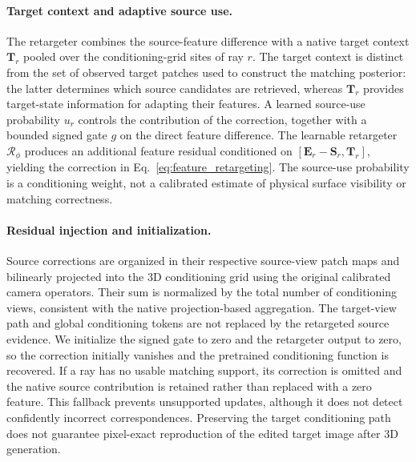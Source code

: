 \begin{appendix}
\paragraph{Target context and adaptive source use.}
The retargeter combines the source-feature difference with a native target context $\mathbf{T}_r$ pooled over the conditioning-grid sites of ray $r$.
The target context is distinct from the set of observed target patches used to construct the matching posterior: the latter determines which source candidates are retrieved, whereas $\mathbf{T}_r$ provides target-state information for adapting their features.
A learned source-use probability $u_r$ controls the contribution of the correction, together with a bounded signed gate $g$ on the direct feature difference.
The learnable retargeter $\mathcal{R}_{\phi}$ produces an additional feature residual conditioned on $[\mathbf{E}_r-\mathbf{S}_r,\mathbf{T}_r]$, yielding the correction in Eq.~\eqref{eq:feature_retargeting}.
The source-use probability is a conditioning weight, not a calibrated estimate of physical surface visibility or matching correctness.

\paragraph{Residual injection and initialization.}
Source corrections are organized in their respective source-view patch maps and bilinearly projected into the 3D conditioning grid using the original calibrated camera operators.
Their sum is normalized by the total number of conditioning views, consistent with the native projection-based aggregation.
The target-view path and global conditioning tokens are not replaced by the retargeted source evidence.
We initialize the signed gate to zero and the retargeter output to zero, so the correction initially vanishes and the pretrained conditioning function is recovered.
If a ray has no usable matching support, its correction is omitted and the native source contribution is retained rather than replaced with a zero feature.
This fallback prevents unsupported updates, although it does not detect confidently incorrect correspondences.
Preserving the target conditioning path does not guarantee pixel-exact reproduction of the edited target image after 3D generation.


\end{appendix}
